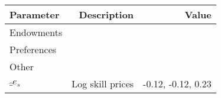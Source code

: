\begin{tabular}{lrr}
\hline
Parameter & Description  & Value  \\
\hline
Endowments &   &   \\
Preferences &   &   \\
Other &   &   \\
$\hat_{e}_{s}$ & Log skill prices  & -0.12, -0.12, 0.23  \\
\hline
\end{tabular}%
